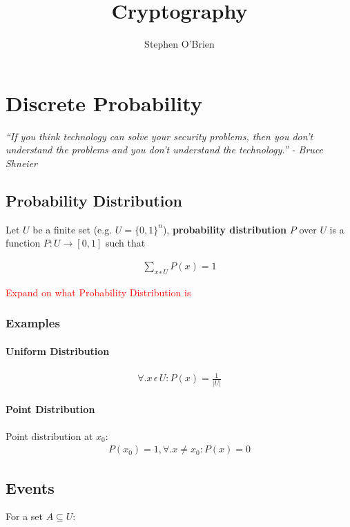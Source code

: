 \documentclass[11pt,a4paper]{report}
\title{Cryptography}
\author{Stephen O'Brien}
\newcommand\todo[1]{\noindent\textcolor{red}{#1}}
\begin{document}
\maketitle
\chapter{Discrete Probability}
\begin{center}
		\emph{
			``If you think technology can solve your security problems, then you don't understand the problems and you don't understand the technology.'' - Bruce Shneier
		}
\end{center}



\section{Probability Distribution}
Let $U$ be a finite set (e.g. $U = \{0,1\}^n$), \textbf{probability distribution} $P$ over $U$ is a function $P : U \rightarrow [0,1]$ such that

\begin{gather}
	\sum\limits_{x \, \epsilon \, U} P(x) = 1
\end{gather}

\todo{Expand on what Probability Distribution is}

\subsection{Examples}
\subsubsection{Uniform Distribution}
\begin{gather}
	\forall . x \,\epsilon\, U : P(x) = \frac{1}{|U|}
\end{gather}
\subsubsection{Point Distribution}
Point distribution at $x_0$:
\begin{gather}
	P(x_0) = 1, \forall.x \neq x_0 : P(x) = 0
\end{gather}

	
	
\section{Events}
For a set $A \subseteq U$:
\end{document}
